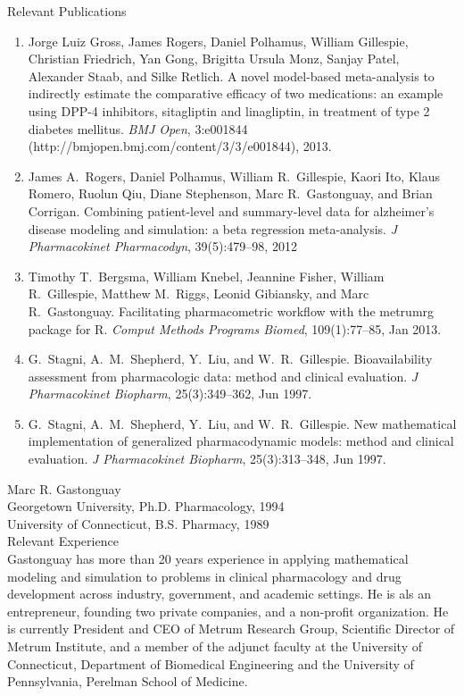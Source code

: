\noindent
{\sc Relevant Publications}
\vspace*{-3pt}
\begin{enumerate}
\item Jorge Luiz Gross, James Rogers, Daniel Polhamus, William
  Gillespie, Christian Friedrich, Yan Gong, Brigitta Ursula Monz,
  Sanjay Patel, Alexander Staab, and Silke Retlich. A novel
  model-based meta-analysis to indirectly estimate the comparative
  efficacy of two medications: an example using DPP-4 inhibitors,
  sitagliptin and linagliptin, in treatment of type 2 diabetes
  mellitus. {\it BMJ Open}, 3:e001844
  (http://bmjopen.bmj.com/content/3/3/e001844), 2013. 
\item James A.\ Rogers, Daniel Polhamus, William R.\ Gillespie, Kaori Ito,
  Klaus Romero, Ruolun Qiu, Diane Stephenson, Marc R.\ Gastonguay, and
  Brian Corrigan. Combining patient-level and summary-level data for
  alzheimer’s disease modeling and simulation: a beta regression
  meta-analysis. {\it J Pharmacokinet Pharmacodyn}, 39(5):479--98, 2012
\item Timothy T.\ Bergsma, William Knebel, Jeannine Fisher, William R.\
  Gillespie, Matthew M.\ Riggs, Leonid Gibiansky, and Marc R.\
  Gastonguay. Facilitating pharmacometric workflow with the metrumrg
  package for R. {\it Comput Methods Programs Biomed}, 109(1):77--85, Jan
  2013. 
\item G.\ Stagni, A.\ M.\ Shepherd, Y.\ Liu, and W.\ R.\
  Gillespie. Bioavailability assessment from pharmacologic data:
  method and clinical evaluation. {\it J Pharmacokinet Biopharm},
  25(3):349--362, Jun 1997.
\item G.\ Stagni, A.\ M.\ Shepherd, Y.\ Liu, and W.\ R.\ Gillespie. New
  mathematical implementation of generalized pharmacodynamic models:
  method and clinical evaluation. {\it J Pharmacokinet Biopharm},
  25(3):313--348, Jun 1997. 
\end{enumerate}

\vspace*{12pt}
\noindent
{\sc Marc R. Gastonguay}
\\[2pt]
Georgetown University, Ph.D. Pharmacology, 1994 \\
University of Connecticut, B.S. Pharmacy, 1989
\\

\noindent
{\sc Relevant Experience} \\[2pt]
Gastonguay has more than 20 years experience in applying mathematical
modeling and simulation to problems in clinical pharmacology and drug
development across industry, government, and academic settings. He is
als an entrepreneur, founding two private companies, and a non-profit
organization. He is currently President and CEO of Metrum Research
Group, Scientific Director of Metrum Institute, and a member of the
adjunct faculty at the University of Connecticut, Department of
Biomedical Engineering and the University of Pennsylvania, Perelman
School of Medicine.  
\\  

